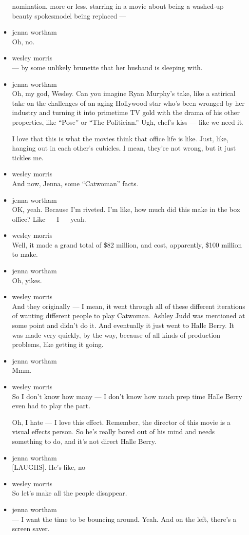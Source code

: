 \begin{itemize}
  nomination, more or less, starring in a movie about being a washed-up
  beauty spokesmodel being replaced ---
\item
  jenna wortham\\
  Oh, no.
\item
  wesley morris\\
  --- by some unlikely brunette that her husband is sleeping with.
\item
  jenna wortham\\
  Oh, my god, Wesley. Can you imagine Ryan Murphy's take, like a
  satirical take on the challenges of an aging Hollywood star who's been
  wronged by her industry and turning it into primetime TV gold with the
  drama of his other properties, like ``Pose'' or ``The Politician.''
  Ugh, chef's kiss --- like we need it.

  I love that this is what the movies think that office life is like.
  Just, like, hanging out in each other's cubicles. I mean, they're not
  wrong, but it just tickles me.
\item
  wesley morris\\
  And now, Jenna, some ``Catwoman'' facts.
\item
  jenna wortham\\
  OK, yeah. Because I'm riveted. I'm like, how much did this make in the
  box office? Like --- I --- yeah.
\item
  wesley morris\\
  Well, it made a grand total of \$82 million, and cost, apparently,
  \$100 million to make.
\item
  jenna wortham\\
  Oh, yikes.
\item
  wesley morris\\
  And they originally --- I mean, it went through all of these different
  iterations of wanting different people to play Catwoman. Ashley Judd
  was mentioned at some point and didn't do it. And eventually it just
  went to Halle Berry. It was made very quickly, by the way, because of
  all kinds of production problems, like getting it going.
\item
  jenna wortham\\
  Mmm.
\item
  wesley morris\\
  So I don't know how many --- I don't know how much prep time Halle
  Berry even had to play the part.

  Oh, I hate --- I love this effect. Remember, the director of this
  movie is a visual effects person. So he's really bored out of his mind
  and needs something to do, and it's not direct Halle Berry.
\item
  jenna wortham\\
  {[}LAUGHS{]}. He's like, no ---
\item
  wesley morris\\
  So let's make all the people disappear.
\item
  jenna wortham\\
  --- I want the time to be bouncing around. Yeah. And on the left,
  there's a screen saver.


\end{itemize}
